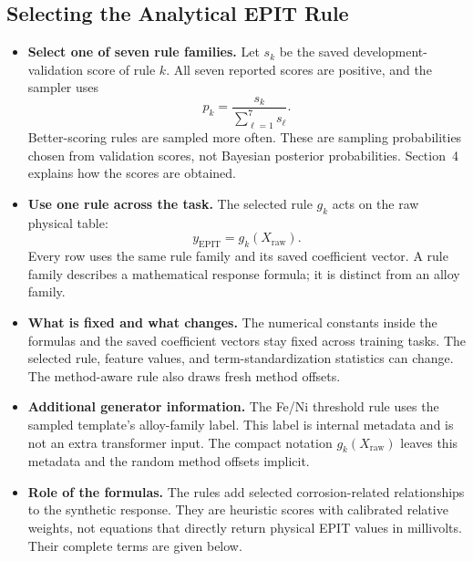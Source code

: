 \documentclass[11pt]{article}
\newenvironment{notes}
  {\begin{itemize}\setlength{\itemsep}{0.45em}\setlength{\parsep}{0pt}}
  {\end{itemize}}
\begin{document}
\subsection{Selecting the Analytical EPIT Rule}
\label{sec:analytical-target-selection}

\begin{notes}
    \item \textbf{Select one of seven rule families.} Let \(s_k\)
    be the saved development-validation score of rule \(k\).
    All seven reported scores are positive, and the sampler uses
    \[
        p_k=\frac{s_k}{\sum_{\ell=1}^{7}s_\ell}.
    \]
    Better-scoring rules are sampled more often. These are
    sampling probabilities chosen from validation scores, not
    Bayesian posterior probabilities. Section~4 explains how
    the scores are obtained.

    \item \textbf{Use one rule across the task.}
    The selected rule \(g_k\) acts on the raw physical table:
    \begin{equation}
        y_{\mathrm{EPIT}}=g_k(X_{\mathrm{raw}}).
        \label{eq:epit-target}
    \end{equation}
    Every row uses the same rule family and its saved
    coefficient vector. A rule family describes a mathematical
    response formula; it is distinct from an alloy family.

    \item \textbf{What is fixed and what changes.}
    The numerical constants inside the formulas and the saved
    coefficient vectors stay fixed across training tasks.
    The selected rule, feature values, and term-standardization
    statistics can change. The method-aware rule also draws
    fresh method offsets.

    \item \textbf{Additional generator information.}
    The Fe/Ni threshold rule uses the sampled template's
    alloy-family label. This label is internal metadata and
    is not an extra transformer input. The compact notation
    \(g_k(X_{\mathrm{raw}})\) leaves this metadata and the
    random method offsets implicit.

    \item \textbf{Role of the formulas.}
    The rules add selected corrosion-related relationships to
    the synthetic response. They are heuristic scores with
    calibrated relative weights, not equations that directly
    return physical EPIT values in millivolts. Their complete
    terms are given below.
\end{notes}
\end{document}

